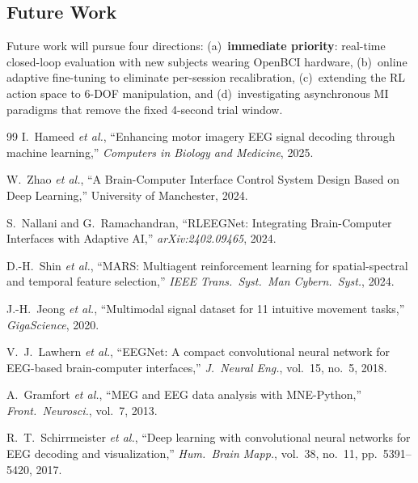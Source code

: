 \documentclass[12pt, a4paper]{article}
\begin{document}
\subsection{Future Work}

Future work will pursue four directions: (a)~\textbf{immediate priority}: real-time closed-loop evaluation with new subjects wearing OpenBCI hardware, (b)~online adaptive fine-tuning to eliminate per-session recalibration, (c)~extending the RL action space to 6-DOF manipulation, and (d)~investigating asynchronous MI paradigms that remove the fixed 4-second trial window.

\begin{thebibliography}{99}
I.~Hameed \emph{et al.}, ``Enhancing motor imagery EEG signal decoding through machine learning,'' \textit{Computers in Biology and Medicine}, 2025.

W.~Zhao \emph{et al.}, ``A Brain-Computer Interface Control System Design Based on Deep Learning,'' University of Manchester, 2024.

S.~Nallani and G.~Ramachandran, ``RLEEGNet: Integrating Brain-Computer Interfaces with Adaptive AI,'' \textit{arXiv:2402.09465}, 2024.

D.-H.~Shin \emph{et al.}, ``MARS: Multiagent reinforcement learning for spatial-spectral and temporal feature selection,'' \textit{IEEE Trans.\ Syst.\ Man Cybern.\ Syst.}, 2024.

J.-H.~Jeong \emph{et al.}, ``Multimodal signal dataset for 11 intuitive movement tasks,'' \textit{GigaScience}, 2020.

V.~J.~Lawhern \emph{et al.}, ``EEGNet: A compact convolutional neural network for EEG-based brain-computer interfaces,'' \textit{J.\ Neural Eng.}, vol.~15, no.~5, 2018.

A.~Gramfort \emph{et al.}, ``MEG and EEG data analysis with MNE-Python,'' \textit{Front.\ Neurosci.}, vol.~7, 2013.

R.~T.~Schirrmeister \emph{et al.}, ``Deep learning with convolutional neural networks for EEG decoding and visualization,'' \textit{Hum.\ Brain Mapp.}, vol.~38, no.~11, pp.~5391--5420, 2017.


\end{thebibliography}
\end{document}
